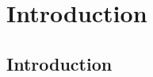 \documentclass[letterpaper,12pt,titlepage,oneside,final]{book}
\begin{document}
 

\chapter{Introduction}



\section{Introduction}
\end{document}
